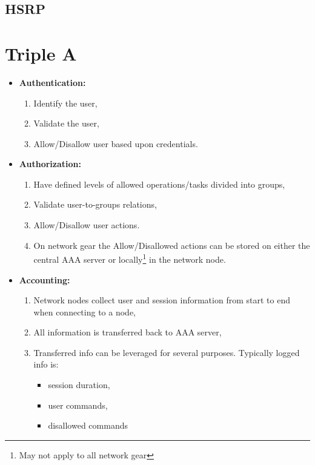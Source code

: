 \documentclass[a4paper,12pt,twoside,twocolumn,landscape]{book}
\begin{document}
\section{HSRP}


\chapter{Triple A}



\newpage

\begin{itemize}
    \item \textbf{Authentication:}
    \begin{enumerate}
        \item Identify the user,
        \item Validate the user,
        \item Allow/Disallow user based upon credentials.
    \end{enumerate}
    \item \textbf{Authorization:}
    \begin{enumerate}
        \item Have defined levels of allowed operations/tasks divided into groups,
        \item Validate user-to-groups relations,
        \item Allow/Disallow user actions.
        \item On network gear the Allow/Disallowed actions can be stored on either the central AAA server or locally\footnote{May not apply to all network gear} in the network node.
    \end{enumerate}
    \item \textbf{Accounting:}
    \begin{enumerate}
        \item Network nodes collect user and session information from start to end when connecting to a node,
        \item All information is transferred back to AAA server,
        \item Transferred info can be leveraged for several purposes. Typically logged info is:
        \begin{itemize}
            \item session duration,
            \item user commands,
            \item disallowed commands
        \end{itemize}
    \end{enumerate}
\end{itemize}
\end{document}
